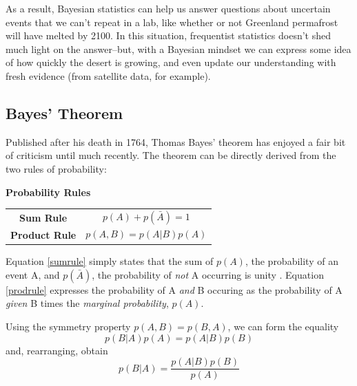 \documentclass[12pt]{article}
\begin{document}
As a result, Bayesian statistics can help us answer questions about uncertain events that we can't repeat in a lab, like whether or not Greenland permafrost will have melted by 2100. In this situation, frequentist statistics doesn't shed much light on the answer--but, with a Bayesian mindset we can express some idea of how quickly the desert is growing, and even update our understanding with fresh evidence (from satellite data, for example). \cite{bishop_2006}

\subsection{Bayes' Theorem}
Published after his death in 1764, Thomas Bayes' theorem has enjoyed a fair bit of criticism until much recently. The theorem can be directly derived from the two rules of probability:



\begin{centering}
\textbf{Probability Rules}

\begin{tabular}{cc}


\textbf{Sum Rule} &     \begin{equation}\label{sumrule}
p(A) + p(\bar{A}) = 1
    
\end{equation}   \\
\textbf{Product Rule} &      \begin{equation}\label{prodrule}
     p(A,B) = p(A | B)p(A)
\end{equation}  \\


\end{tabular}
\end{centering}

Equation \ref{sumrule} simply states that the sum of $p(A)$, the probability of an event A, and $p(\bar{A})$, the probability of \textit{not} A occurring is unity \cite{bayesianmethods}. Equation \ref{prodrule} expresses the probability of A \textit{and} B occuring as the probability of A \textit{given} B times the \textit{marginal probability}, $p(A)$.

Using the symmetry property $p(A,B) = p(B,A)$, we can form the equality
\begin{equation}
    p(B|A)p(A) = p(A | B)p(B) 
\end{equation}
and, rearranging, obtain
\begin{equation}\label{bayes}
    p(B|A) = \frac{p(A | B)p(B)}{p(A)}
\end{equation}
\end{document}
